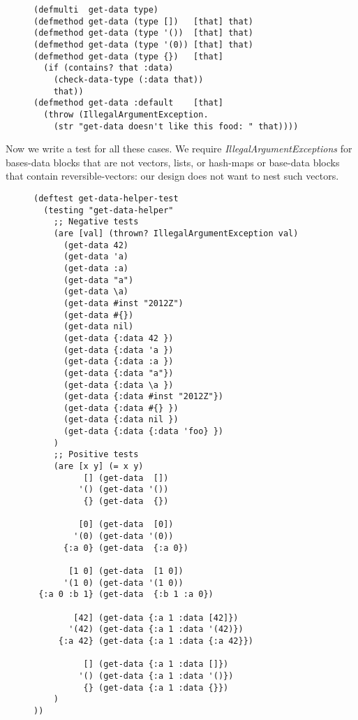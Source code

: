 \documentclass[11pt]{article}
\begin{document}
\begin{figure}[H]
\label{get-data-helper}
\begin{verbatim}
(defmulti  get-data type)
(defmethod get-data (type [])   [that] that)
(defmethod get-data (type '())  [that] that)
(defmethod get-data (type '(0)) [that] that)
(defmethod get-data (type {})   [that]
  (if (contains? that :data)
    (check-data-type (:data that))
    that))
(defmethod get-data :default    [that]
  (throw (IllegalArgumentException.
    (str "get-data doesn't like this food: " that))))
\end{verbatim}
\end{figure}

Now we write a test for all these cases. We require
\emph{IllegalArgumentExceptions} for bases-data blocks that are not vectors,
lists, or hash-maps or base-data blocks that contain
reversible-vectors: our design does not want to nest such vectors.

\begin{figure}[H]
\label{test-get-data-helper}
\begin{verbatim}
(deftest get-data-helper-test
  (testing "get-data-helper"
    ;; Negative tests
    (are [val] (thrown? IllegalArgumentException val)
      (get-data 42)
      (get-data 'a)
      (get-data :a)
      (get-data "a")
      (get-data \a)
      (get-data #inst "2012Z")
      (get-data #{})
      (get-data nil)
      (get-data {:data 42 })
      (get-data {:data 'a })
      (get-data {:data :a })
      (get-data {:data "a"})
      (get-data {:data \a })
      (get-data {:data #inst "2012Z"})
      (get-data {:data #{} })
      (get-data {:data nil })
      (get-data {:data {:data 'foo} })
    )
    ;; Positive tests
    (are [x y] (= x y)
          [] (get-data  [])
         '() (get-data '())
          {} (get-data  {})

         [0] (get-data  [0])
        '(0) (get-data '(0))
      {:a 0} (get-data  {:a 0})

       [1 0] (get-data  [1 0])
      '(1 0) (get-data '(1 0))
 {:a 0 :b 1} (get-data  {:b 1 :a 0})

        [42] (get-data {:a 1 :data [42]})
       '(42) (get-data {:a 1 :data '(42)})
     {:a 42} (get-data {:a 1 :data {:a 42}})

          [] (get-data {:a 1 :data []})
         '() (get-data {:a 1 :data '()})
          {} (get-data {:a 1 :data {}})
    )
))
\end{verbatim}
\end{figure}
\end{document}
